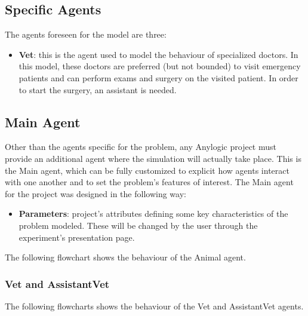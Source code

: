 \documentclass[review]{article}
\begin{document}
\subsection{Specific Agents}
The agents foreseen for the model are three:
\begin{itemize}
\item \textbf{Vet}:  this is the agent used to model the behaviour of specialized doctors. In this model, these doctors are preferred (but not bounded) to visit emergency patients and can perform exams and surgery on the visited patient. In order to start the surgery, an assistant is needed.
\end{itemize}

\subsection{Main Agent}
\label{Main}
Other than the agents specific for the problem, any Anylogic project must provide an additional agent where the simulation will actually take place. This is the Main agent, which can be fully customized to explicit how agents interact with one another and to set the problem's features of interest. The Main agent for the project was designed in the following way:
\begin{itemize}
\item \textbf{Parameters}: project's attributes defining some key characteristics of the problem modeled. These will be changed by the user through the experiment's presentation page.
\end{itemize}

The following flowchart shows the behaviour of the Animal agent.\\

\subsubsection{Vet and AssistantVet}
The following flowcharts shows the behaviour of the Vet and AssistantVet agents.
\end{document}
